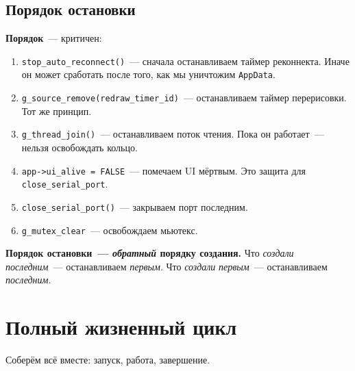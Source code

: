 \subsection{Порядок остановки}

\textbf{Порядок}~--- критичен:

\begin{enumerate}
    \item \texttt{stop\_auto\_reconnect()}~--- сначала
          останавливаем таймер реконнекта. Иначе
          он может сработать после того, как
          мы уничтожим \texttt{AppData}.
    \item \texttt{g\_source\_remove(redraw\_timer\_id)}~---
          останавливаем таймер перерисовки.
          Тот же принцип.
    \item \texttt{g\_thread\_join()}~--- останавливаем
          поток чтения. Пока он работает~---
          нельзя освобождать кольцо.
    \item \texttt{app->ui\_alive = FALSE}~--- помечаем UI
          мёртвым. Это защита для \texttt{close\_serial\_port}.
    \item \texttt{close\_serial\_port()}~--- закрываем
          порт последним.
    \item \texttt{g\_mutex\_clear}~--- освобождаем мьютекс.
\end{enumerate}

\begin{warnbox}
\textbf{Порядок остановки~--- \emph{обратный} порядку
создания.} Что \emph{создали} \emph{последним}~--- останавливаем
\emph{первым}. Что \emph{создали} \emph{первым}~---
останавливаем \emph{последним}.
\end{warnbox}

\section{Полный жизненный цикл}
\label{sec:lifecycle-full}

Соберём всё вместе: запуск, работа,
завершение.


